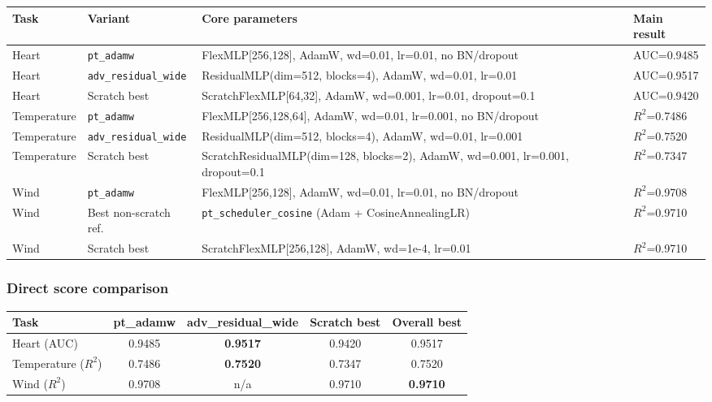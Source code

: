 \documentclass[11pt,a4paper]{article}
\begin{document}
\begin{center}
\small
\begin{tabular}{p{2.8cm} p{2.9cm} p{5.6cm} p{3.6cm}}
\toprule
\textbf{Task} & \textbf{Variant} & \textbf{Core parameters} & \textbf{Main result} \\
\midrule
Heart & \texttt{pt\_adamw} & FlexMLP[256,128], AdamW, wd=0.01, lr=0.01, no BN/dropout & AUC=0.9485 \\
Heart & \texttt{adv\_residual\_wide} & ResidualMLP(dim=512, blocks=4), AdamW, wd=0.01, lr=0.01 & AUC=0.9517 \\
Heart & Scratch best & ScratchFlexMLP[64,32], AdamW, wd=0.001, lr=0.01, dropout=0.1 & AUC=0.9420 \\
\midrule
Temperature & \texttt{pt\_adamw} & FlexMLP[256,128,64], AdamW, wd=0.01, lr=0.001, no BN/dropout & $R^2$=0.7486 \\
Temperature & \texttt{adv\_residual\_wide} & ResidualMLP(dim=512, blocks=4), AdamW, wd=0.01, lr=0.001 & $R^2$=0.7520 \\
Temperature & Scratch best & ScratchResidualMLP(dim=128, blocks=2), AdamW, wd=0.001, lr=0.001, dropout=0.1 & $R^2$=0.7347 \\
\midrule
Wind & \texttt{pt\_adamw} & FlexMLP[256,128], AdamW, wd=0.01, lr=0.01, no BN/dropout & $R^2$=0.9708 \\
Wind & Best non-scratch ref. & \texttt{pt\_scheduler\_cosine} (Adam + CosineAnnealingLR) & $R^2$=0.9710 \\
Wind & Scratch best & ScratchFlexMLP[256,128], AdamW, wd=1e-4, lr=0.01 & $R^2$=0.9710 \\
\bottomrule
\end{tabular}
\end{center}

\subsubsection*{Direct score comparison}

\begin{center}
\small
\begin{tabular}{lcccc}
\toprule
\textbf{Task} & \textbf{pt\_adamw} & \textbf{adv\_residual\_wide} & \textbf{Scratch best} & \textbf{Overall best} \\
\midrule
Heart (AUC) & 0.9485 & \textbf{0.9517} & 0.9420 & 0.9517 \\
Temperature ($R^2$) & 0.7486 & \textbf{0.7520} & 0.7347 & 0.7520 \\
Wind ($R^2$) & 0.9708 & n/a & 0.9710 & \textbf{0.9710} \\
\bottomrule
\end{tabular}
\end{center}
\end{document}
